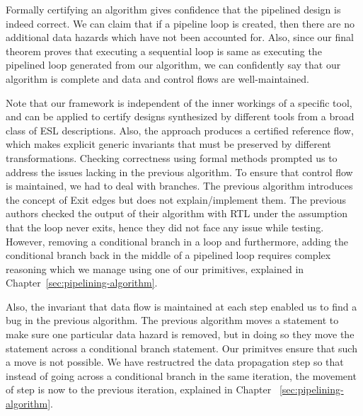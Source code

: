 Formally certifying an algorithm gives confidence that the pipelined design is indeed correct. We can claim that if a pipeline loop is created, then there are no additional data hazards which have not been accounted for. Also, since our final theorem proves that executing a sequential loop is same as executing the pipelined loop generated from our algorithm, we can confidently say that our algorithm is complete and data and control flows are well-maintained.  

Note that our framework is independent of the inner workings of a specific tool, and can be applied to certify designs synthesized by different tools from a broad class of ESL descriptions. Also, the approach produces a certified reference flow, which makes explicit generic invariants that must be preserved by different transformations. Checking correctness using formal methods prompted us to address the issues lacking in the previous algorithm. To ensure that control flow is maintained, we had to deal with branches. The previous algorithm introduces the concept of Exit edges but does not explain/implement them. The previous authors checked the output of their algorithm with RTL under the assumption that the loop never exits, hence they did not face any issue while testing. However, removing a conditional branch in a loop and furthermore, adding the conditional branch back in the middle of a pipelined loop requires complex reasoning which we manage using one of our primitives, explained in Chapter~\ref{sec:pipelining-algorithm}.

Also, the invariant that data flow is maintained at each step enabled us to find a bug in the previous algorithm. The previous algorithm moves a statement to make sure one particular data hazard is removed, but in doing so they move the statement across a conditional branch statement. Our primitves ensure that such a move is not possible. We have restructred the data propagation step so that instead of going across a conditional branch in the same iteration, the movement of step is now to the previous iteration, explained in Chapter ~\ref{sec:pipelining-algorithm}. 



